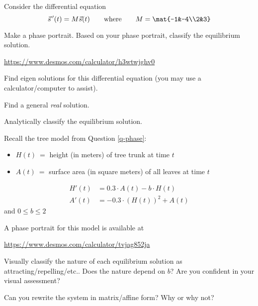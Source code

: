 \documentclass{workbook}
\begin{document}
\begin{slide}
	\question
		Consider the differential equation
		\[
		\vec s\,'(t) = M\vec s(t)\qquad\text{where}\qquad M=\mat{-1&-4\\2&3}
		\]
	
	\begin{parts}
		\item Make a phase portrait. Based on your phase portrait, classify the equilibrium solution.

		{\small \url{https://www.desmos.com/calculator/h3wtwjghv0}}
		\item Find eigen solutions for this differential equation (you may use a calculator/computer to assist).
		\item Find a general \emph{real} solution.
		\item Analytically classify the equilibrium solution.
	\end{parts}
\end{slide}


%
%


\begin{slide}
	\question
	Recall the tree model from Question \ref{q-phase}:
	\begin{itemize}
		\item $H(t)\ =$ height (in meters) of tree trunk at time $t$
		\item $A(t)\ =$ surface area (in square meters) of all leaves at time $t$
	\end{itemize}
	\begin{align*}
		H'(t) &= 0.3\cdot A(t)-b\cdot H(t)\\
		A'(t) &= -0.3\cdot (H(t))^2 + A(t)
	\end{align*}
	and $0 \leq b \leq 2$

	A phase portrait for this model is available at 
	
		{\small
		\url{https://www.desmos.com/calculator/tvjag852ja}
		}
	\bigskip
	\phantom{x}
	\begin{parts}
		\item Visually classify the nature of each equilibrium solution as attracting/repelling/etc.. 
		Does the nature depend on $b$? Are you confident in your visual assessment?
		\item Can you rewrite the system in matrix/affine form? Why or why not?
	\end{parts}
	\bigskip
	\phantom{x}
\end{slide}
\end{document}
